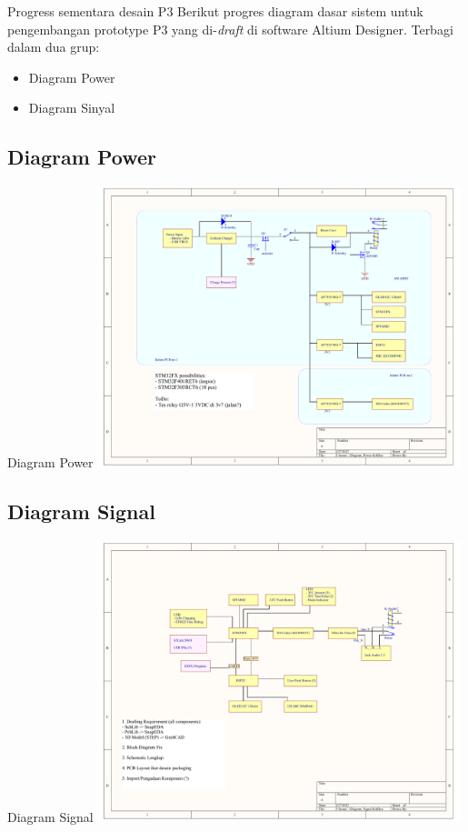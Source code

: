 \documentclass[table,dvipsnames]{beamer}
\begin{document}
	\begin{frame}
		\begin{exampleblock}{Progress sementara desain P3}
			Berikut progres diagram dasar sistem untuk pengembangan prototype P3 yang di-\textit{draft} di software Altium Designer.
			Terbagi dalam dua grup:
			\begin{itemize}
				\item Diagram Power
				\item Diagram Sinyal
			\end{itemize}
		\end{exampleblock}
	\end{frame}

	\begin{frame}
		\subsection{Diagram Power}
		\begin{exampleblock}{Diagram Power}
			\centering
			\includegraphics[width=300pt]{images/diagram_power}
		\end{exampleblock}
	\end{frame}

	\begin{frame}
		\subsection{Diagram Signal}
		\begin{exampleblock}{Diagram Signal}
			\centering
			\includegraphics[width=300pt]{images/diagram_signal}
		\end{exampleblock}
	\end{frame}
	
\end{document}
